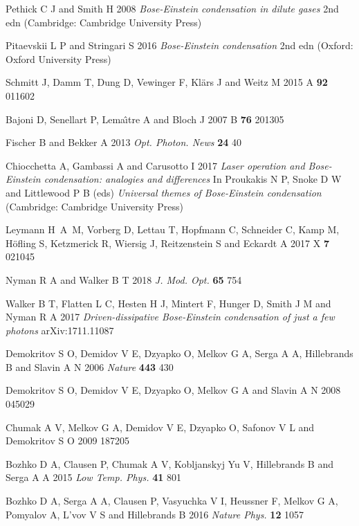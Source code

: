 \documentclass[12pt, a4paper]{iopart}
\begin{document}
\begin{thebibliography}{84}
Pethick C J and Smith H 2008 {\it Bose-Einstein condensation in dilute gases} 2nd edn (Cambridge: Cambridge University Press)

Pitaevskii L P and Stringari S 2016 {\it Bose-Einstein condensation} 2nd edn (Oxford: Oxford University Press)

Schmitt J, Damm T, Dung D, Vewinger F, Kl\"ars J and Weitz M 2015 \PR A {\bf 92} 011602

Bajoni D, Senellart P, Lema\^{\i}tre A and Bloch J 2007 \PR B {\bf 76} 201305

Fischer B and Bekker A 2013 {\it Opt. Photon. News} {\bf 24} 40

Chiocchetta A, Gambassi A and Carusotto I 2017 {\it Laser operation and Bose-Einstein condensation: analogies and differences}
In Proukakis N P, Snoke D W and Littlewood P B (eds) {\it Universal themes of Bose-Einstein condensation} (Cambridge: Cambridge University Press)

Leymann H~A~M, Vorberg D, Lettau T, Hopfmann C, Schneider C, Kamp M, H\"ofling S, Ketzmerick R, Wiersig J, Reitzenstein S and Eckardt A 2017 \PR X {\bf 7} 021045

Nyman R A and Walker B T 2018 {\it J. Mod. Opt.} {\bf 65} 754

Walker B T, Flatten L C, Hesten H J, Mintert F, Hunger D, Smith J M and Nyman R A 2017 {\it Driven-dissipative Bose-Einstein condensation of just a few photons} arXiv:1711.11087

Demokritov S O, Demidov V E, Dzyapko O, Melkov G A, Serga A A, Hillebrands B and Slavin A N 2006 {\it Nature} {\bf 443} 430

Demokritov S O, Demidov V E, Dzyapko O, Melkov G A and Slavin A N 2008  045029

Chumak A V, Melkov G A, Demidov V E, Dzyapko O, Safonov V L and Demokritov S O 2009  187205

Bozhko D A, Clausen P, Chumak A V, Kobljanskyj Yu V, Hillebrands B and Serga A A 2015 {\it Low Temp. Phys.} {\bf 41} 801

Bozhko D A, Serga A A, Clausen P, Vasyuchka V I, Heussner F, Melkov G A, Pomyalov A, L'vov V S and Hillebrands B 2016 {\it Nature Phys.} {\bf 12} 1057


\end{thebibliography}
\end{document}

